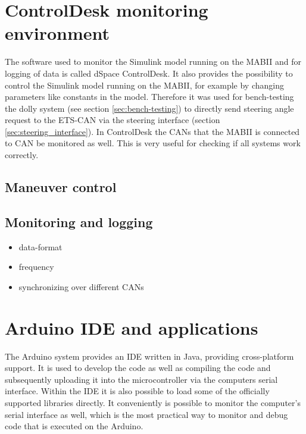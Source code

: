 \documentclass[ExampleMasters.tex]{subfiles}
\begin{document}
\section{ControlDesk monitoring environment}
\label{sec:control_desk}
The software used to monitor the Simulink model running on the \gls{MABII} and for logging of data is called dSpace ControlDesk. It also provides the possibility to control the Simulink model running on the MABII, for example by changing parameters like constants in the model. Therefore it was used for bench-testing the dolly system (see section \ref{sec:bench-testing}) to directly send steering angle request to the \gls{ETS}-\gls{CAN} via the steering interface (section \ref{sec:steering_interface}). In ControlDesk the CANs that the \gls{MABII} is connected to \gls{CAN} be monitored as well. This is very useful for checking if all systems work correctly. 
\subsection{Maneuver control}


\subsection{Monitoring and logging}
\begin{itemize}
	\item data-format
	\item frequency
	\item synchronizing over different CANs	
\end{itemize}


\section{Arduino IDE and applications}
\label{sec:arduino_applications}

The Arduino system provides an \gls{IDE}  written in Java, providing cross-platform support. It is used to develop the code as well as compiling the code and subsequently uploading it into the microcontroller via the computers serial interface. Within the IDE it is also possible to load some of the officially supported libraries directly. It conveniently is possible to monitor the computer's serial interface as well, which is the most practical way to monitor and debug code that is executed on the Arduino. 
\end{document}
